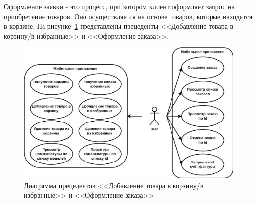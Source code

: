 Оформление заявки - это процесс, при котором клиент оформляет запрос на приобретение товаров.
Оно осуществляется на основе товаров, которые находятся в корзине.
На рисунке~\ref{fig:UML_use_case_order} представлены прецеденты <<Добавление товара в корзину/в избранные>>
и <<Оформление заказа>>.

\begin{figure}[!htb]
    \centering

    \includegraphics[width=16cm]
    {images/UML/use_case/orders/orders.png}

    \caption{Диаграмма прецедентов <<Добавление товара в корзину/в избранные>> и <<Оформление заказа>>}

    \label{fig:UML_use_case_order}
\end{figure}
